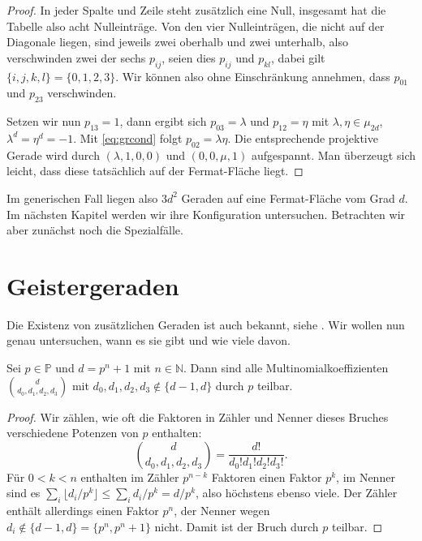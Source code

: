 \begin{proof}
In jeder Spalte und Zeile steht zusätzlich eine Null, insgesamt hat die Tabelle also acht Nulleinträge. Von den vier Nulleinträgen, die nicht auf der Diagonale liegen, sind jeweils zwei oberhalb und zwei unterhalb, also verschwinden zwei der sechs $p_{ij}$, seien dies $p_{ij}$ und $p_{kl}$, dabei gilt $\{i,j,k,l\} = \{0,1,2,3\}$. Wir können also ohne Einschränkung annehmen, dass $p_{01}$ und $p_{23}$ verschwinden.

Setzen wir nun $p_{13} = 1$, dann ergibt sich $p_{03} = \lambda$ und $p_{12} = \eta$ mit $\lambda, \eta \in \mu_{2d}$, $\lambda^d = \eta^d = -1$. Mit \eqref{eq:grcond} folgt $p_{02} = \lambda\eta$. Die entsprechende projektive Gerade wird durch $(\lambda, 1, 0, 0)$ und $(0,0,\mu,1)$ aufgespannt. Man überzeugt sich leicht, dass diese tatsächlich auf der Fermat-Fläche liegt.
\end{proof}

Im generischen Fall liegen also $3d^2$ Geraden auf eine Fermat-Fläche vom Grad $d$. Im nächsten Kapitel werden wir ihre Konfiguration untersuchen. Betrachten wir aber zunächst noch die Spezialfälle.

\section{Geistergeraden}
Die Existenz von zusätzlichen Geraden ist auch bekannt, siehe \cite[S.~14f]{LinesOnFermat}. Wir wollen nun genau untersuchen, wann es sie gibt und wie viele davon.
\begin{prop}
Sei $p \in \mathbb P$ und $d = p^n+1$ mit $n \in \mathbb N$. Dann sind alle Multinomialkoeffizienten $\binom d{d_0,d_1,d_2,d_3}$ mit $d_0, d_1, d_2, d_3 \not\in \{d-1, d\}$ durch $p$ teilbar.
\end{prop}
\begin{proof}
Wir zählen, wie oft die Faktoren in Zähler und Nenner dieses Bruches verschiedene Potenzen von $p$ enthalten:
\begin{equation*}
\binom d{d_0,d_1,d_2,d_3} = \frac{d!}{d_0! d_1! d_2! d_3!}.
\end{equation*}
Für $0 < k < n$ enthalten im Zähler $p^{n-k}$ Faktoren einen Faktor $p^k$, im Nenner sind es $\sum_i \lfloor d_i/p^k \rfloor \leq \sum_i d_i/p^k = d/p^k$, also höchstens ebenso viele. Der Zähler enthält allerdings einen Faktor $p^n$, der Nenner wegen $d_i \not\in \{d-1, d\} = \{p^n, p^n+1\}$ nicht. Damit ist der Bruch durch $p$ teilbar.
\end{proof}

